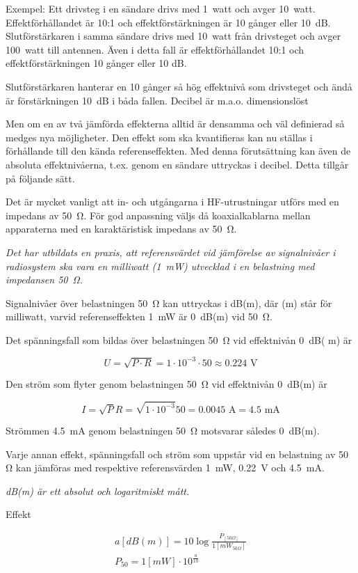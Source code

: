 Exempel: Ett drivsteg i en sändare drivs med 1~watt och avger 10~watt.
Effektförhållandet är 10:1 och effektförstärkningen är 10 gånger
eller 10~dB. Slutförstärkaren i samma sändare drivs med 10~watt från
drivsteget och avger 100~watt till antennen. Även i detta fall är
effektförhållandet 10:1 och effektförstärkningen 10 gånger eller 10
dB.

Slutförstärkaren hanterar en 10 gånger så hög effektnivå som
drivsteget och ändå är förstärkningen 10~dB i båda fallen. Decibel är
m.a.o. dimensionslöst

Men om en av två jämförda effekterna alltid är densamma och väl
definierad så medges nya möjligheter. Den effekt som ska
kvantifieras kan nu ställas i förhållande till den kända
referenseffekten. Med denna förutsättning kan även de absoluta
effektnivåerna, t.ex. genom en sändare uttryckas i decibel. Detta
tillgår på följande sätt.

Det är mycket vanligt att in- och utgångarna i HF-utrustningar utförs
med en impedans av 50~Ω. För god anpassning väljs då koaxialkablarna
mellan apparaterna med en karaktäristisk impedans av 50~Ω.

\emph{Det har utbildats en praxis, att referensvärdet vid jämförelse
  av signalnivåer i radiosystem ska vara en milliwatt (1~mW)
  utvecklad i en belastning med impedansen 50~Ω.}

Signalnivåer över belastningen 50~Ω kan uttryckas i dB(m), där (m)
står för milliwatt, varvid referenseffekten 1~mW är 0~dB(m) vid 50~Ω.

Det spänningsfall som bildas över belastningen 50~Ω vid effektnivån
0~dB( m) är

\[U = \sqrt{P\cdot R} = 1\cdot 10^{-3} \cdot 50 \approx 0.224 \text{ V}\]

Den ström som flyter genom belastningen 50~Ω vid effektnivån 0~dB(m)
är

\[
I = \sqrt{P}{R} = \sqrt{1\cdot 10^{-3}}{50} = 0.0045 \text{ A} = 4.5 \text{ mA}
\]

Strömmen 4.5~mA genom belastningen 50~Ω motsvarar således 0~dB(m).

Varje annan effekt, spänningsfall och ström som uppstår vid en
belastning av 50 Ω kan jämföras med respektive referensvärden 1~mW,
0.22~V och 4.5~mA.

\emph{dB(m) är ett absolut och logaritmiskt mått.}

Effekt

\begin{gather*}
  a [dB(m)] = 10 \log\frac{P_{[50Ω]}}{1[mW_{50Ω}]} \\
  P_{50} = 1 [mW] \cdot 10^{\frac{a}{10}}
\end{gather*}

